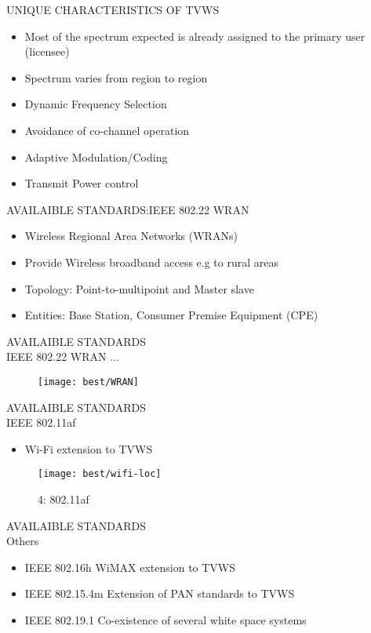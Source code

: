 \documentclass[]{beamer}
\begin{document}
\begin{frame}{UNIQUE CHARACTERISTICS OF TVWS}
	\begin{itemize}
		\item {Most of the spectrum expected is already assigned to the primary user (licensee)}
		\item {Spectrum varies from region to region}
		\item {Dynamic Frequency Selection}
		\item {Avoidance of co-channel operation}
		\item {Adaptive Modulation/Coding}
		\item {Transmit Power control}
	\end{itemize}
\end{frame}
\begin{frame}{AVAILAIBLE STANDARDS:IEEE 802.22 WRAN}
	\begin{itemize}
		\item {Wireless Regional Area
			Networks (WRANs)}
		\item {Provide Wireless broadband access e.g to rural areas}
		\item{Topology: Point-to-multipoint and Master slave }
		\item {Entities: Base Station, Consumer Premise Equipment  (CPE)}
	\end{itemize}

	
\end{frame}
\begin{frame}{AVAILAIBLE STANDARDS\\IEEE 802.22 WRAN ...}
\begin{figure}
\centering
\texttt{[image: best/WRAN]}
\caption{}
\label{fig:WRAN}
\end{figure}	
	
\end{frame}
\begin{frame}{AVAILAIBLE STANDARDS\\IEEE 802.11af}
	\begin{itemize}
		\item {Wi-Fi extension to TVWS}
	\end{itemize}	
	\begin{figure}
\centering
\texttt{[image: best/wifi-loc]}
\caption{4: 802.11af}
\label{fig:wifi-loc}
\end{figure}

\end{frame}
\begin{frame}{AVAILAIBLE STANDARDS\\Others}
	\begin{itemize}
		\item {IEEE 802.16h WiMAX extension to TVWS}
		\item {IEEE 802.15.4m Extension of PAN standards to TVWS}
		\item{IEEE 802.19.1 Co-existence of several white space systems}
	\end{itemize}
	
\end{frame}
\end{document}
